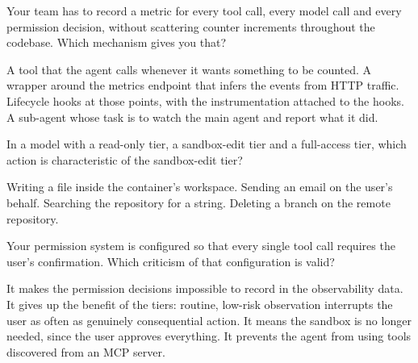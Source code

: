 \begin{questions}
\qitem Your team has to record a metric for every tool call, every model call and every permission
decision, without scattering counter increments throughout the codebase. Which mechanism gives you that?
\begin{choices}
  \choice A tool that the agent calls whenever it wants something to be counted.
  \choice A wrapper around the metrics endpoint that infers the events from HTTP traffic.
  \CorrectChoice Lifecycle hooks at those points, with the instrumentation attached to the hooks.
  \choice A sub-agent whose task is to watch the main agent and report what it did.
\end{choices}
\dontknow
{}

\qitem In a model with a read-only tier, a sandbox-edit tier and a full-access tier, which action is
characteristic of the sandbox-edit tier?
\begin{choices}
  \CorrectChoice Writing a file inside the container's workspace.
  \choice Sending an email on the user's behalf.
  \choice Searching the repository for a string.
  \choice Deleting a branch on the remote repository.
\end{choices}
\dontknow
{}

\qitem Your permission system is configured so that every single tool call requires the user's
confirmation. Which criticism of that configuration is valid?
\begin{choices}
  \choice It makes the permission decisions impossible to record in the observability data.
  \CorrectChoice It gives up the benefit of the tiers: routine, low-risk observation interrupts the user as often as genuinely consequential action.
  \choice It means the sandbox is no longer needed, since the user approves everything.
  \choice It prevents the agent from using tools discovered from an MCP server.
\end{choices}
\dontknow
{}


\end{questions}
